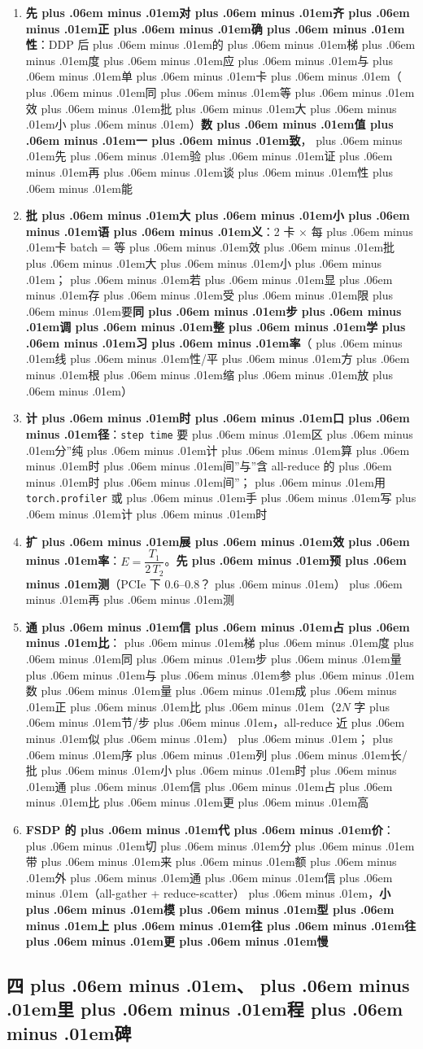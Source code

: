 \documentclass[
]{article}
\newcommand{\passthrough}[1]{#1}
\providecommand{\tightlist}{%
  \setlength{\itemsep}{0pt}\setlength{\parskip}{0pt}}
\def\zh#1{{\zhfont #1}}
\def\sym#1{{\symfont #1}}
\def\zhglue{\hskip0pt plus .06em minus .01em}
\begin{document}
\begin{enumerate}
\def\labelenumi{\arabic{enumi}.}
\tightlist
\item
  \textbf{\zh{先\zhglue 对\zhglue 齐\zhglue 正\zhglue 确\zhglue 性}}\zh{：}DDP \zh{后\zhglue 的\zhglue 梯\zhglue 度\zhglue 应\zhglue 与\zhglue 单\zhglue 卡\zhglue （\zhglue 同\zhglue 等\zhglue 效\zhglue 批\zhglue 大\zhglue 小\zhglue ）}\textbf{\zh{数\zhglue 值\zhglue 一\zhglue 致}}\zh{，\zhglue 先\zhglue 验\zhglue 证\zhglue 再\zhglue 谈\zhglue 性\zhglue 能}
\item
  \textbf{\zh{批\zhglue 大\zhglue 小\zhglue 语\zhglue 义}}\zh{：}2 \zh{卡} \sym{×} \zh{每\zhglue 卡} batch = \zh{等\zhglue 效\zhglue 批\zhglue 大\zhglue 小\zhglue ；\zhglue 若\zhglue 显\zhglue 存\zhglue 受\zhglue 限\zhglue 要}\textbf{\zh{同\zhglue 步\zhglue 调\zhglue 整\zhglue 学\zhglue 习\zhglue 率}}\zh{（\zhglue 线\zhglue 性}/\zh{平\zhglue 方\zhglue 根\zhglue 缩\zhglue 放\zhglue ）}
\item
  \textbf{\zh{计\zhglue 时\zhglue 口\zhglue 径}}\zh{：}\passthrough{\lstinline!step time!} \zh{要\zhglue 区\zhglue 分}''\zh{纯\zhglue 计\zhglue 算\zhglue 时\zhglue 间}''\zh{与}''\zh{含} all-reduce \zh{的\zhglue 时\zhglue 间}''\zh{；\zhglue 用} \passthrough{\lstinline!torch.profiler!} \zh{或\zhglue 手\zhglue 写\zhglue 计\zhglue 时}
\item
  \textbf{\zh{扩\zhglue 展\zhglue 效\zhglue 率}}\zh{：}\(E = \dfrac{T_1}{2\,T_2}\)\zh{。}\textbf{\zh{先\zhglue 预\zhglue 测}}\zh{（}PCIe \zh{下} 0.6--0.8\zh{？\zhglue ）\zhglue 再\zhglue 测}
\item
  \textbf{\zh{通\zhglue 信\zhglue 占\zhglue 比}}\zh{：\zhglue 梯\zhglue 度\zhglue 同\zhglue 步\zhglue 量\zhglue 与\zhglue 参\zhglue 数\zhglue 量\zhglue 成\zhglue 正\zhglue 比\zhglue （}\(2N\) \zh{字\zhglue 节}/\zh{步\zhglue ，}all-reduce \zh{近\zhglue 似\zhglue ）\zhglue ；\zhglue 序\zhglue 列\zhglue 长}/\zh{批\zhglue 小\zhglue 时\zhglue 通\zhglue 信\zhglue 占\zhglue 比\zhglue 更\zhglue 高}
\item
  \textbf{FSDP \zh{的\zhglue 代\zhglue 价}}\zh{：\zhglue 切\zhglue 分\zhglue 带\zhglue 来\zhglue 额\zhglue 外\zhglue 通\zhglue 信\zhglue （}all-gather + reduce-scatter\zh{）\zhglue ，}\textbf{\zh{小\zhglue 模\zhglue 型\zhglue 上\zhglue 往\zhglue 往\zhglue 更\zhglue 慢}}
\end{enumerate}

\subsection{\zh{四\zhglue 、\zhglue 里\zhglue 程\zhglue 碑}}\label{ux56dbux91ccux7a0bux7891-4}
\end{document}
